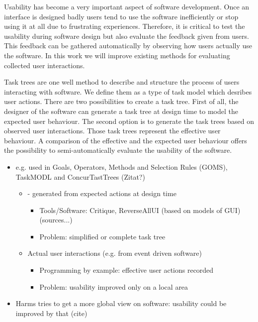 Usability has become a very important aspect of software development. 
Once an interface is designed badly users tend to use the software inefficiently or stop using it at all due to frustrating experiences.
Therefore, it is critical to test the usability during software design but also evaluate the feedback given from users. 
This feedback can be gathered automatically by observing how users actually use the software.
In this work we will improve existing methods for evaluating collected user interactions.

Task trees are one well method to describe and structure the process of users interacting with software. 
We define them as a type of task model which desribes user actions. There are two possibilities to create a task tree.
First of all, the designer of the software can generate a task tree at design time to model the expected user behaviour\cite{harms2013}.
The second option is to generate the task trees based on observed user interactions. 
Those task trees represent the effective user behaviour.
A comparison of the effective and the expected user behaviour offers the possibility to semi-automatically evaluate the usability of the software.  




\begin{itemize}
	\item  e.g. used in Goals, Operators, Methods and Selection Rules (GOMS), TaskMODL and ConcurTastTrees (Zitat?)
 	\begin{itemize}
		\item - generated from expected actions at design time
      		\begin{itemize}
			\item Tools/Software: Critique, ReverseAllUI (based on models of GUI) (sources...)
     			\item Problem: simplified or complete task tree
		\end{itemize}
		\item Actual user interactions (e.g. from event driven software)
     		\begin{itemize} 
			\item Programming by example: effective user actions recorded
			\item Problem: usability improved only on a local area
		\end{itemize}
	\end{itemize}
	\item Harms tries to get a more global view on software: usability could be improved by that (cite) 
\end{itemize}


